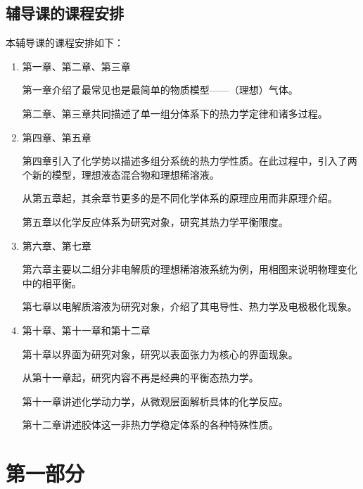 \documentclass[9pt]{beamer}
\begin{document}
	\subsection{辅导课的课程安排}
	
	\begin{frame}
	
	本辅导课的课程安排如下：	
	\begin{enumerate}
	
	\item 第一章、第二章、第三章
	
		第一章介绍了最常见也是最简单的物质模型——{\color{red}（理想）气体}。
		
		第二章、第三章共同描述了单一组分体系下的{\color{red}热力学定律}和{\color{red}诸多过程}。
	
	\item 第四章、第五章
	
		第四章引入了{\color{red}化学势}以描述多组分系统的热力学性质。在此过程中，引入了两个新的模型，{\color{red}理想液态混合物}和{\color{red}理想稀溶液}。
		
		{\color{blue}从第五章起，其余章节更多的是不同化学体系的原理应用而非原理介绍。}
		
		第五章以{\color{red}化学反应体系}为研究对象，研究其热力学平衡限度。
	
	\item 第六章、第七章
	
		第六章主要以二组分非电解质的理想稀溶液系统为例，用相图来说明{\color{red}物理变化}中的相平衡。
		
		第七章以{\color{red}电解质溶液}为研究对象，介绍了其电导性、{\color{red}热力学}及电极极化现象。
	
	\item 第十章、第十一章和第十二章
	
		第十章以界面为研究对象，研究以表面张力为核心的界面现象。
		
		{\color{blue}从第十一章起，研究内容不再是经典的平衡态热力学。}
		
		第十一章讲述{\color{red}化学动力学}，从{\color{red}微观层面}解析{\color{red}具体}的化学反应。
		
		第十二章讲述{\color{red}胶体}这一非热力学稳定体系的各种特殊性质。	
	
	\end{enumerate}
	
	\end{frame}
	
	\section{第一部分}
	
\end{document}
